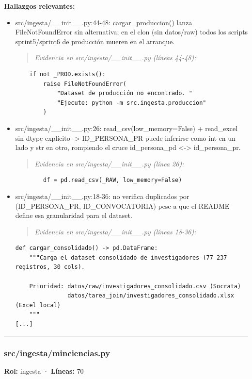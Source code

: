 \textbf{Hallazgos relevantes:}
\begin{itemize}
  \item src/ingesta/\_\_init\_\_.py:44-48: cargar\_produccion() lanza FileNotFoundError sin alternativa; en el clon (sin datos/raw) todos los scripts sprint5/sprint6 de producción mueren en el arranque.
\begin{quote}\footnotesize\ttfamily
\noindent\emph{Evidencia en src/ingesta/\_\_init\_\_.py (líneas 44-48):}
\end{quote}
\begin{lstlisting}
    if not _PROD.exists():
        raise FileNotFoundError(
            "Dataset de producción no encontrado. "
            "Ejecute: python -m src.ingesta.produccion"
        )
\end{lstlisting}

  \item src/ingesta/\_\_init\_\_.py:26: read\_csv(low\_memory=False) + read\_excel sin dtype explícito -> ID\_PERSONA\_PR puede inferirse como int en un lado y str en otro, rompiendo el cruce id\_persona\_pd <-> id\_persona\_pr.
\begin{quote}\footnotesize\ttfamily
\noindent\emph{Evidencia en src/ingesta/\_\_init\_\_.py (línea 26):}
\end{quote}
\begin{lstlisting}
        df = pd.read_csv(_RAW, low_memory=False)
\end{lstlisting}

  \item src/ingesta/\_\_init\_\_.py:18-36: no verifica duplicados por (ID\_PERSONA\_PR, ID\_CONVOCATORIA) pese a que el README define esa granularidad para el dataset.
\begin{quote}\footnotesize\ttfamily
\noindent\emph{Evidencia en src/ingesta/\_\_init\_\_.py (líneas 18-36):}
\end{quote}
\begin{lstlisting}
def cargar_consolidado() -> pd.DataFrame:
    """Carga el dataset consolidado de investigadores (77 237 registros, 30 cols).

    Prioridad: datos/raw/investigadores_consolidado.csv (Socrata)
               datos/tarea_join/investigadores_consolidado.xlsx (Excel local)
    """
[...]
\end{lstlisting}

\end{itemize}

\medskip
\hrule

\subsubsection{src/ingesta/minciencias.py}
\textbf{Rol:} ingesta · \textbf{Líneas:} 70

